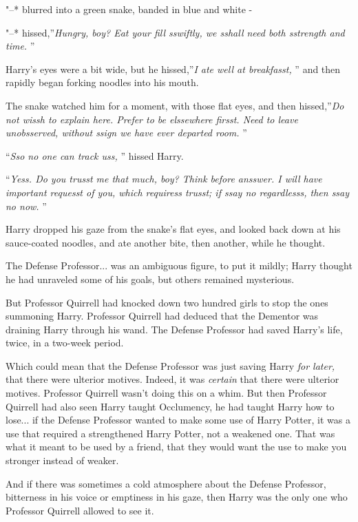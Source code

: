 "--* blurred into a green snake, banded in blue and white -

"--* hissed,''\emph{Hungry, boy? Eat your fill sswiftly, we sshall need
both sstrength and time.} ''

Harry's eyes were a bit wide, but he hissed,''\emph{I ate well at
breakfasst,} '' and then rapidly began forking noodles into his mouth.

The snake watched him for a moment, with those flat eyes, and then
hissed,''\emph{Do not wissh to explain here. Prefer to be elssewhere
firsst. Need to leave unobsserved, without ssign we have ever departed
room.} ''

``\emph{Sso no one can track uss,} '' hissed Harry.

``\emph{Yess. Do you trusst me that much, boy? Think before ansswer. I
will have important requesst of you, which requiress trusst; if ssay no
regardlesss, then ssay no now.} ''

Harry dropped his gaze from the snake's flat eyes, and looked back down
at his sauce-coated noodles, and ate another bite, then another, while
he thought.

The Defense Professor... was an ambiguous figure, to put it mildly;
Harry thought he had unraveled some of his goals, but others remained
mysterious.

But Professor Quirrell had knocked down two hundred girls to stop the
ones summoning Harry. Professor Quirrell had deduced that the Dementor
was draining Harry through his wand. The Defense Professor had saved
Harry's life, twice, in a two-week period.

Which could mean that the Defense Professor was just saving Harry
\emph{for later,} that there were ulterior motives. Indeed, it was
\emph{certain} that there were ulterior motives. Professor Quirrell
wasn't doing this on a whim. But then Professor Quirrell had also seen
Harry taught Occlumency, he had taught Harry how to lose... if the
Defense Professor wanted to make some use of Harry Potter, it was a use
that required a strengthened Harry Potter, not a weakened one. That was
what it meant to be used by a friend, that they would want the use to
make you stronger instead of weaker.

And if there was sometimes a cold atmosphere about the Defense
Professor, bitterness in his voice or emptiness in his gaze, then Harry
was the only one who Professor Quirrell allowed to see it.


